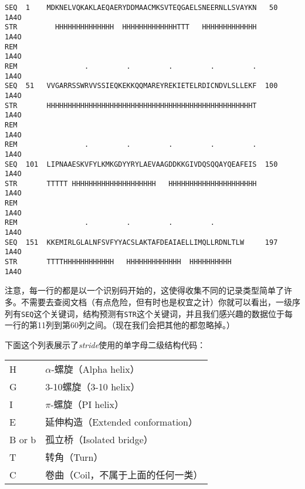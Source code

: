 \begin{lstlisting}
SEQ  1    MDKNELVQKAKLAEQAERYDDMAACMKSVTEQGAELSNEERNLLSVAYKN   50          1A4O
STR         HHHHHHHHHHHHHH  HHHHHHHHHHHHHTTT   HHHHHHHHHHHHH               1A4O
REM                                                                        1A4O
REM                .         .         .         .         .               1A4O
SEQ  51   VVGARRSSWRVVSSIEQKEKKQQMAREYREKIETELRDICNDVLSLLEKF  100          1A4O
STR       HHHHHHHHHHHHHHHHHHHHHHHHHHHHHHHHHHHHHHHHHHHHHHHHHT               1A4O
REM                                                                        1A4O
REM                .         .         .         .         .               1A4O
SEQ  101  LIPNAAESKVFYLKMKGDYYRYLAEVAAGDDKKGIVDQSQQAYQEAFEIS  150          1A4O
STR       TTTTT HHHHHHHHHHHHHHHHHHHH   HHHHHHHHHHHHHHHHHHHHH               1A4O
REM                                                                        1A4O
REM                .         .         .         .                         1A4O
SEQ  151  KKEMIRLGLALNFSVFYYACSLAKTAFDEAIAELLIMQLLRDNLTLW     197          1A4O
STR       TTTTHHHHHHHHHHHH   HHHHHHHHHHHHH  HHHHHHHHHH                     1A4O
\end{lstlisting}

注意，每一行的都是以一个识别码开始的，这使得收集不同的记录类型简单了许多。不需要去查阅文档（有点危险，但有时也是权宜之计）你就可以看出，一级序列有\verb|SEQ|这个关键词，结构预测有\verb|STR|这个关键词，并且我们感兴趣的数据位于每一行的第11列到第60列之间。（现在我们会把其他的都忽略掉。）

下面这个列表展示了\textit{stride}使用的单字母二级结构代码：

\begin{table}[!htbp]
  \begin{center}
  \begin{tabu} to 0.5\linewidth {X[1,l,m]X[2,l,m]}
  \toprule
  H & $\alpha$-螺旋（Alpha helix）\\
  G & 3-10螺旋（3-10 helix）\\
  I & $\pi$-螺旋（PI helix）\\
  E & 延伸构造（Extended conformation）\\
  B or b& 孤立桥（Isolated bridge）\\
  T & 转角（Turn）\\
  C & 卷曲（Coil，不属于上面的任何一类）\\
  \bottomrule
  \end{tabu}
  \end{center}
\end{table}

